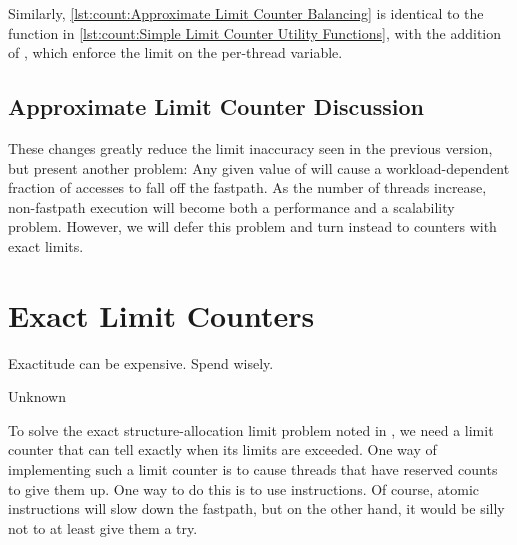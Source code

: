 \begin{listing}

\caption{Approximate Limit Counter Variables}
\label{lst:count:Approximate Limit Counter Variables}
\end{listing}

\begin{listing}

\caption{Approximate Limit Counter Balancing}
\label{lst:count:Approximate Limit Counter Balancing}
\end{listing}

\begin{fcvref}
Similarly,
\cref{lst:count:Approximate Limit Counter Balancing}
is identical to the  function in
\cref{lst:count:Simple Limit Counter Utility Functions},
with the addition of
, which enforce the
 limit on the per-thread  variable.
\end{fcvref}

\subsection{Approximate Limit Counter Discussion}

These changes greatly reduce the limit inaccuracy seen in the previous version,
but present another problem:
Any given value of  will cause a workload-dependent
fraction of accesses to fall off the fastpath.
As the number of threads increase, non-fastpath execution will become both
a performance and a scalability problem.
However, we will defer this problem and turn instead to counters
with exact limits.

\section{Exact Limit Counters}
\label{sec:count:Exact Limit Counters}
%
\epigraph{Exactitude can be expensive.
	  Spend wisely.}{Unknown}

To solve the exact structure-allocation limit problem noted in
\QuickQuizRef{\QcountQexactcnt},
we need a limit counter that can tell exactly when its limits are
exceeded.
One way of implementing such a limit counter is to
cause threads that have reserved counts to give them up.
One way to do this is to use  instructions.
Of course, atomic instructions will slow down the fastpath, but on the
other hand, it would be silly not to at least give them a try.

